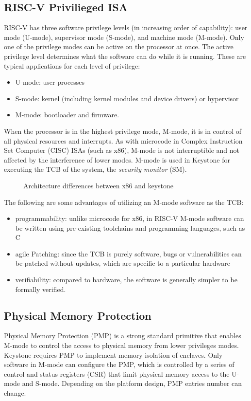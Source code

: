 \subsection{RISC-V Privilieged ISA}
RISC-V \cite{risc-v-spec} has three software privilege levels (in increasing order of capability): user mode (U-mode), supervisor mode (S-mode), and machine mode (M-mode). Only one of the privilege modes can be active on the processor at once.
The active privilege level determines what the software can do while it is running. These are typical applications for each level of privilege:
\begin{itemize}
    \item U-mode: user processes 
    \item S-mode: kernel (including kernel modules and device drivers) or hypervisor
    \item M-mode: bootloader and firmware.
\end{itemize}
When the processor is in the highest privilege mode, M-mode, it is in control of all physical resources and interrupts. As with microcode in Complex Instruction Set Computer (CISC) ISAs (such as x86), M-mode is not interruptible and not affected by the interference of lower modes. M-mode is used in Keystone for executing the TCB of the system, the \textit{security monitor} (SM).
\begin{figure}[h!]
    \centering
    
    \caption{Architecture differences between x86 and keystone}
    \label{keystone-vs-x86}
\end{figure}
The following are some advantages of utilizing an M-mode software as the TCB:
\begin{itemize}
    \item programmability: unlike microcode for x86, in RISC-V M-mode software can be written using pre-existing toolchains and programming languages, such as C 
    \item agile Patching: since the TCB is purely software, bugs or vulnerabilities can be patched without updates, which are specific to a particular hardware 
    \item verifiability: compared to hardware, the software is generally simpler to be formally verified.
\end{itemize}

\subsection{Physical Memory Protection}
Physical Memory Protection (PMP) is a strong standard primitive that enables M-mode to control the access to physical memory from lower privileges modes. Keystone requires PMP to implement memory isolation of enclaves.
Only software in M-mode can configure the PMP, which is controlled by a series of control and status registers (CSR) that limit physical memory access to the U-mode and S-mode. Depending on the platform design, PMP entries number can change. 

